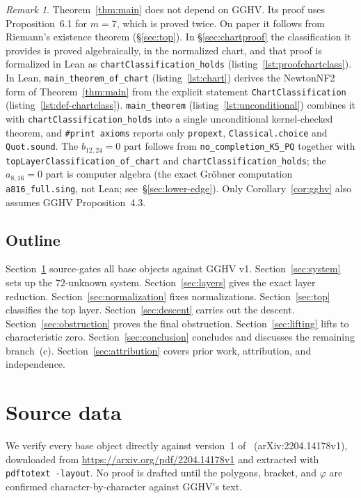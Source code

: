 \documentclass[a4paper,11pt]{article}
\theoremstyle{plain}
\theoremstyle{definition}
\theoremstyle{remark}
\newtheorem{remark}[theorem]{Remark}
\begin{document}
\begin{remark}\label{rem:conditional}
Theorem~\ref{thm:main} does not depend on GGHV. Its proof uses Proposition~6.1 for $m=7$,
which is proved twice. On paper it follows from Riemann's existence theorem
(\S\ref{sec:top}). In \S\ref{sec:chartproof} the classification it provides is proved
algebraically, in the normalized chart, and that proof is formalized in Lean as
\texttt{chartClassification\_holds} (listing~\ref{lst:proofchartclass}).
In Lean, \texttt{main\_theorem\_of\_chart} (listing~\ref{lst:chart}) derives the NewtonNF2 form of
Theorem~\ref{thm:main} from the explicit statement \texttt{ChartClassification}
(listing~\ref{lst:def-chartclass}). \texttt{main\_theorem} (listing~\ref{lst:unconditional})
combines it with \texttt{chartClassification\_holds} into a single unconditional kernel-checked
theorem, and \texttt{\#print axioms} reports only \texttt{propext}, \texttt{Classical.choice}
and \texttt{Quot.sound}.
The $b_{12,24}=0$ part follows from \texttt{no\_completion\_K5\_PQ} together with \texttt{topLayerClassification\_of\_chart} and \texttt{chartClassification\_holds}; the $a_{8,16}=0$ part is computer
algebra (the exact Gr\"obner computation \texttt{a816\_full.sing}, not Lean;
see~\S\ref{sec:lower-edge}). Only Corollary~\ref{cor:gghv} also assumes GGHV
Proposition~4.3.
\end{remark}

\subsection{Outline}

Section~\ref{sec:source} source-gates all base objects against GGHV v1. Section~\ref{sec:system} sets up the $72$-unknown system. Section~\ref{sec:layers} gives the exact layer reduction. Section~\ref{sec:normalization} fixes normalizations. Section~\ref{sec:top} classifies the top layer. Section~\ref{sec:descent} carries out the descent. Section~\ref{sec:obstruction} proves the final obstruction. Section~\ref{sec:lifting} lifts to characteristic zero. Section~\ref{sec:conclusion} concludes and discusses the remaining branch~(c). Section~\ref{sec:attribution} covers prior work, attribution, and independence.

\section{Source data}\label{sec:source}

We verify every base object directly against version~1 of~\cite{GGHV} (arXiv:2204.14178v1), downloaded from \url{https://arxiv.org/pdf/2204.14178v1} and extracted with \texttt{pdftotext -layout}. No proof is drafted until the polygons, bracket, and $\varphi$ are confirmed character-by-character against GGHV's text.
\end{document}
